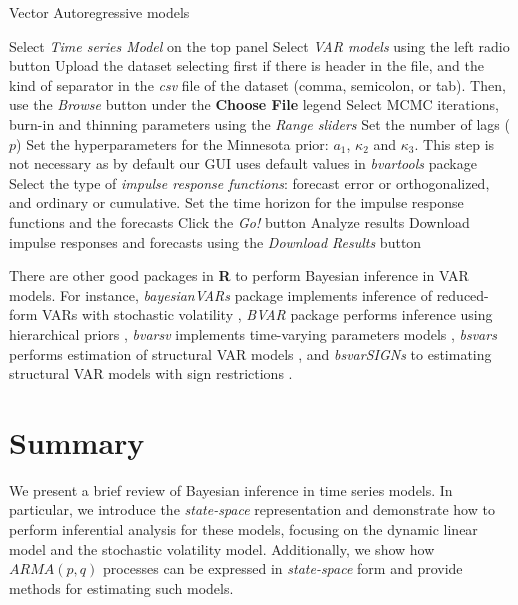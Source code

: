 \begin{algorithm}[h!]
	\caption{Vector Autoregressive models}\label{alg:VAR}
	\begin{algorithmic}[1]  		 			
		\State Select \textit{Time series Model} on the top panel
		\State Select \textit{VAR models} using the left radio button
		\State Upload the dataset selecting first if there is header in the file, and the kind of separator in the \textit{csv} file of the dataset (comma, semicolon, or tab). Then, use the \textit{Browse} button under the \textbf{Choose File} legend
		\State Select MCMC iterations, burn-in and thinning parameters using the \textit{Range sliders}
		\State Set the number of lags ($p$)
		\State Set the hyperparameters for the Minnesota prior: $a_1$, $\kappa_2$ and $\kappa_3$. This step is not necessary as by default our GUI uses default values in \textit{bvartools} package
		\State Select the type of \textit{impulse response functions}: forecast error or orthogonalized, and ordinary or cumulative.
		\State Set the time horizon for the impulse response functions and the forecasts 
		\State Click the \textit{Go!} button
		\State Analyze results
		\State Download impulse responses and forecasts using the \textit{Download Results} button
	\end{algorithmic} 
\end{algorithm}

There are other good packages in \textbf{R} to perform Bayesian inference in VAR models. For instance, \textit{bayesianVARs} package implements inference of reduced-form VARs with stochastic volatility \cite{Gruber2024}, \textit{BVAR} package performs inference using hierarchical priors \cite{Kuschnig2024}, \textit{bvarsv} implements time-varying parameters models \cite{Krueger2022}, \textit{bsvars} performs estimation of structural VAR models \cite{Tomasz2024}, and \textit{bsvarSIGNs} to estimating structural VAR models with sign restrictions \cite{Wang2024}. 
 
\section{Summary}\label{sec85}
We present a brief review of Bayesian inference in time series models. In particular, we introduce the \textit{state-space} representation and demonstrate how to perform inferential analysis for these models, focusing on the dynamic linear model and the stochastic volatility model. Additionally, we show how $ARMA(p,q)$ processes can be expressed in \textit{state-space} form and provide methods for estimating such models.

